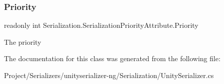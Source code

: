 \subsubsection{\texorpdfstring{Priority}{Priority}}
{\footnotesize\ttfamily readonly int Serialization.\+Serialization\+Priority\+Attribute.\+Priority}



The priority 



The documentation for this class was generated from the following file\+:\begin{DoxyCompactItemize}
\item 
Project/\+Serializers/unityserializer-\/ng/\+Serialization/Unity\+Serializer.\+cs\end{DoxyCompactItemize}
